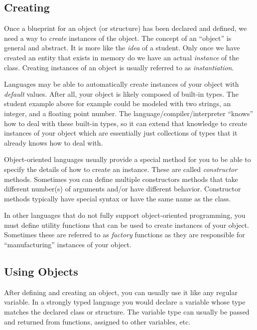 \subsection{Creating}

Once a blueprint for an object (or structure) has been declared and defined, 
we need a way to \emph{create} instances of the object.  The concept of an ``object'' is
general and abstract.  It is more like the \emph{idea} of a student.  Only 
once we have created an entity that exists in memory do we have an 
actual \emph{instance} of the class.  Creating instances of an object is usually
referred to as \emph{instantiation}.  

Languages may be able to automatically create instances of your object
with \emph{default} values.  After all, your object is likely 
composed of built-in types.  The student example above for
example could be modeled with two strings, an integer, and a floating
point number.  The language/compiler/interpreter ``knows'' how to deal
with these built-in types, so it can extend that knowledge to create
instances of your object which are essentially just collections of 
types that it already knows how to deal with.

Object-oriented languages usually provide a special method for you to
be able to specify the details of how to create an instance.  These
are called  \emph{constructor} methods.  Sometimes you can define 
multiple constructors methods that take different number(s) of arguments
and/or have different behavior.  Constructor methods typically have
special syntax or have the same name as the class.

In other languages that do not fully support object-oriented programming, 
you must define utility functions that can be used to create instances 
of your object.  Sometimes these are referred to as \emph{factory} functions 
as they are responsible for ``manufacturing'' instances of your object.

\subsection{Using Objects}

After defining and creating an object, you can usually use it like
any regular variable.  In a strongly typed language you would declare a
variable whose type matches the declared class or structure.  The variable
type can usually be passed and returned from functions, assigned to 
other variables, etc.

